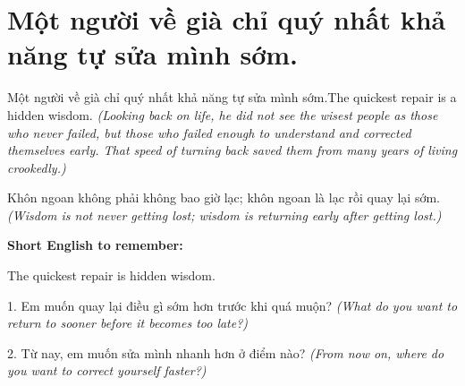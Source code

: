 \section{Một người về già chỉ quý nhất khả năng tự sửa mình sớm.}
\begin{truyen}{Một người về già chỉ quý nhất khả năng tự sửa mình sớm.}{The quickest repair is a hidden wisdom.}
\textit{(Looking back on life, he did not see the wisest people as those who never failed, but those who failed enough to understand and corrected themselves early. That speed of turning back saved them from many years of living crookedly.)}
\end{truyen}
\begin{baihoc}
Khôn ngoan không phải không bao giờ lạc; khôn ngoan là lạc rồi quay lại sớm.
\textit{(Wisdom is not never getting lost; wisdom is returning early after getting lost.)}
\end{baihoc}
\begin{ghinhoanh}\textbf{Short English to remember:}

The quickest repair is hidden wisdom.
\end{ghinhoanh}
\begin{tuhocnhanh}
1. Em muốn quay lại điều gì sớm hơn trước khi quá muộn? \textit{(What do you want to return to sooner before it becomes too late?)}

2. Từ nay, em muốn sửa mình nhanh hơn ở điểm nào? \textit{(From now on, where do you want to correct yourself faster?)}
\end{tuhocnhanh}
\ngancach
